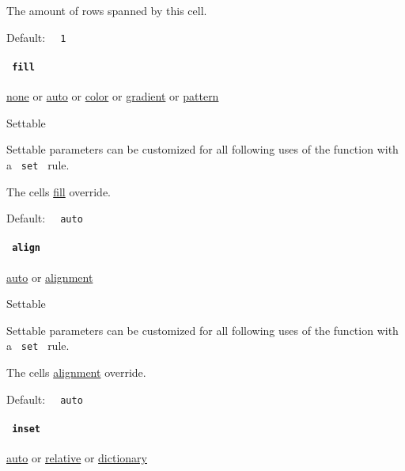 The amount of rows spanned by this cell.

Default: \texttt{\ }{\texttt{\ 1\ }}\texttt{\ }

\paragraph{\texorpdfstring{\texttt{\ fill\ }}{ fill }}\label{definitions-cell-fill}

\href{/docs/reference/foundations/none/}{none} {or}
\href{/docs/reference/foundations/auto/}{auto} {or}
\href{/docs/reference/visualize/color/}{color} {or}
\href{/docs/reference/visualize/gradient/}{gradient} {or}
\href{/docs/reference/visualize/pattern/}{pattern}

{{ Settable }}

\label{definitions-cell-fill-settable-tooltip}
Settable parameters can be customized for all following uses of the
function with a \texttt{\ set\ } rule.

The cell\textquotesingle s
\href{/docs/reference/layout/grid/\#parameters-fill}{fill} override.

Default: \texttt{\ }{\texttt{\ auto\ }}\texttt{\ }

\paragraph{\texorpdfstring{\texttt{\ align\ }}{ align }}\label{definitions-cell-align}

\href{/docs/reference/foundations/auto/}{auto} {or}
\href{/docs/reference/layout/alignment/}{alignment}

{{ Settable }}

\label{definitions-cell-align-settable-tooltip}
Settable parameters can be customized for all following uses of the
function with a \texttt{\ set\ } rule.

The cell\textquotesingle s
\href{/docs/reference/layout/grid/\#parameters-align}{alignment}
override.

Default: \texttt{\ }{\texttt{\ auto\ }}\texttt{\ }

\paragraph{\texorpdfstring{\texttt{\ inset\ }}{ inset }}\label{definitions-cell-inset}

\href{/docs/reference/foundations/auto/}{auto} {or}
\href{/docs/reference/layout/relative/}{relative} {or}
\href{/docs/reference/foundations/dictionary/}{dictionary}

